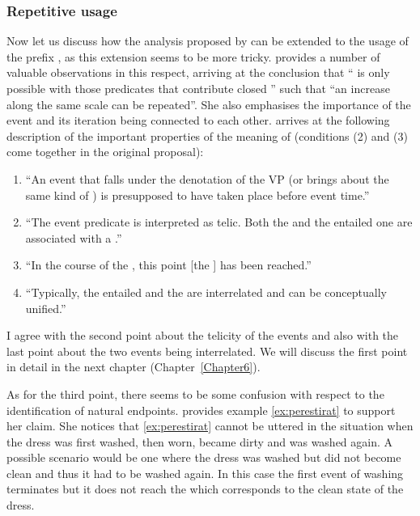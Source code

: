 \subsubsection{Repetitive usage}
Now let us discuss how the analysis proposed by \citet{Kagan:book} can be extended to the  usage of the prefix , as this extension seems to be more tricky. \citet[149]{Kagan:book} provides a number of valuable observations in this respect, arriving at the conclusion that ``  is only possible with those predicates that contribute closed ''
such that ``an increase along the same scale can be repeated''. She also emphasises the importance of the event and its iteration being connected to each other. \citet[148]{Kagan:book} arrives at the following description of the important properties of the  meaning of  (conditions (2) and (3) come together in the original proposal): 
\begin{enumerate}
\item ``An event that falls under the denotation of the VP (or brings about the same kind of ) is presupposed to have taken place before event time.'' 
\item ``The event predicate is interpreted as telic. Both the  and the entailed one are associated with a .'' 
\item ``In the course of the , this point [the ] has been reached.''
\item ``Typically, the entailed and the  are interrelated and can be conceptually unified.''
\end{enumerate}

I agree with the second point about the telicity of the events and also with the last point about the two events being interrelated. We will discuss the first point in detail in the next chapter (Chapter~\ref{Chapter6}). 

As for the third point, there seems to be some confusion with respect to the identification of natural endpoints. \citet{Kagan:book} provides example \ref{ex:perestirat} to support her claim. She notices that \ref{ex:perestirat} cannot be uttered in the situation when the dress was first washed, then worn, became dirty and was washed again. A possible scenario would be one where the dress was washed but did not become clean and thus it had to be washed again. In this case the first event of washing terminates but it does not reach the  which corresponds to the clean state of the dress.

